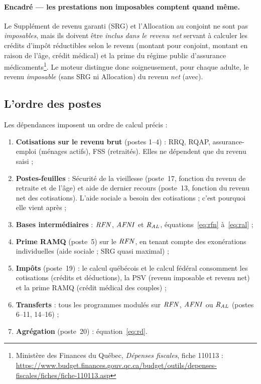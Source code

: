 \paragraph{Encadré --- les prestations non imposables comptent quand même.}
Le Supplément de revenu garanti (SRG) et l'Allocation au conjoint ne sont pas
\emph{imposables}, mais ils doivent être \emph{inclus dans le revenu net}
servant à calculer les crédits d'impôt réductibles selon le revenu (montant
pour conjoint, montant en raison de l'âge, crédit médical) et la prime du
régime public d'assurance médicaments\footnote{Ministère des Finances du
Québec, \emph{Dépenses fiscales}, fiche 110113 :
\url{https://www.budget.finances.gouv.qc.ca/budget/outils/depenses-fiscales/fiches/fiche-110113.asp}}.
Le moteur distingue donc soigneusement, pour chaque adulte, le revenu
\emph{imposable} (sans SRG ni Allocation) du revenu \emph{net} (avec).

\subsection{L'ordre des postes}

Les dépendances imposent un ordre de calcul précis :

\begin{enumerate}
  \item \textbf{Cotisations sur le revenu brut} (postes 1--4) : RRQ, RQAP,
        assurance-emploi (ménages actifs), FSS (retraités). Elles ne
        dépendent que du revenu saisi ;
  \item \textbf{Postes-feuilles} : Sécurité de la vieillesse (poste~17,
        fonction du revenu de retraite et de l'âge) et aide de dernier
        recours (poste~13, fonction du revenu net des cotisations). L'aide
        sociale a besoin des cotisations ; c'est pourquoi elle vient après ;
  \item \textbf{Bases intermédiaires} : $\mathit{RFN}$, $\mathit{AFNI}$ et $\mathit{R_{AL}}$,
        équations~\eqref{eq:rfn} à~\eqref{eq:ral} ;
  \item \textbf{Prime RAMQ} (poste~5) sur le $\mathit{RFN}$, en tenant compte des
        exonérations individuelles (aide sociale ; SRG quasi maximal) ;
  \item \textbf{Impôts} (poste~19) : le calcul québécois et le calcul
        fédéral consomment les cotisations (crédits et déductions), la PSV
        (revenu imposable et revenu net) et la prime RAMQ (crédit médical
        des couples) ;
  \item \textbf{Transferts} : tous les programmes modulés sur $\mathit{RFN}$, $\mathit{AFNI}$
        ou $\mathit{R_{AL}}$ (postes 6--11, 14--16) ;
  \item \textbf{Agrégation} (poste~20) : équation~\eqref{eq:rd}.
\end{enumerate}

